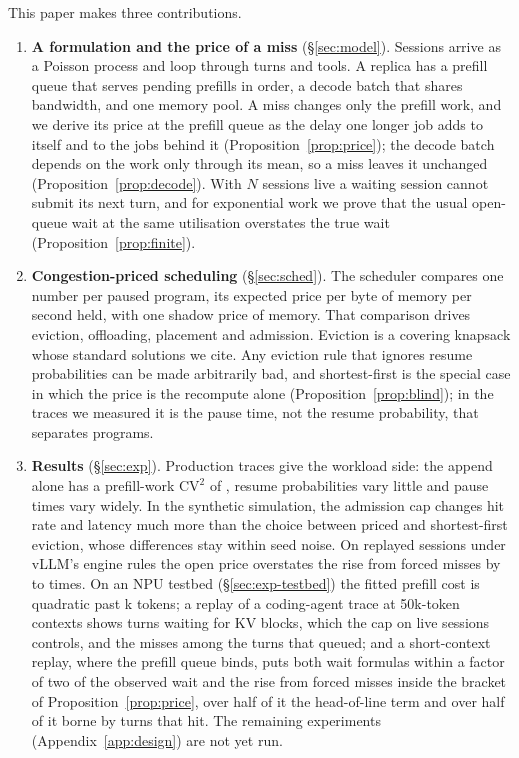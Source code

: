 \documentclass{article}
\theoremstyle{plain}
\theoremstyle{definition}
\theoremstyle{remark}
\begin{document}
This paper makes three contributions.
\begin{enumerate}[leftmargin=*]
\item \textbf{A formulation and the price of a miss} (\S\ref{sec:model}).
Sessions arrive as a Poisson process and loop through turns and tools.
A replica has a prefill queue that serves pending prefills in order, a
decode batch that shares bandwidth, and one memory pool. A miss changes
only the prefill work, and we derive its price at the prefill queue as
the delay one longer job adds to itself and to the jobs behind it
(Proposition~\ref{prop:price}); the decode batch depends on the work
only through its mean, so a miss leaves it unchanged
(Proposition~\ref{prop:decode}). With $N$ sessions live a waiting
session cannot submit its next turn, and for exponential work we prove
that the usual open-queue wait at the same utilisation overstates the
true wait
(Proposition~\ref{prop:finite}).
\item \textbf{Congestion-priced scheduling} (\S\ref{sec:sched}). The
scheduler compares one number per paused program, its expected price
per byte of memory per second held, with one shadow price of memory.
That comparison drives eviction, offloading, placement and admission.
Eviction is a covering knapsack whose standard solutions we cite. Any
eviction rule that ignores resume probabilities can be made arbitrarily
bad, and shortest-first is the special case in which the price is the
recompute alone (Proposition~\ref{prop:blind}); in the traces we
measured it is the pause time, not the resume probability, that
separates programs.
\item \textbf{Results} (\S\ref{sec:exp}). Production traces give the
workload side: the append alone has a prefill-work $\mathrm{CV}^2$ of
\wkCvN, resume probabilities vary little and pause times vary
widely. In the synthetic simulation, the admission cap changes hit rate
and latency much more than the choice between priced and shortest-first
eviction, whose differences stay within seed noise. On replayed sessions under
vLLM's engine rules the open price overstates the rise from forced
misses by \simPriceOverMin{}
to \simPriceOverMax{} times. On an NPU testbed
(\S\ref{sec:exp-testbed}) the fitted prefill cost is quadratic past
\eOneKc k tokens; a replay of a coding-agent trace at 50k-token
contexts shows turns waiting for KV blocks, which the cap on live
sessions controls, and the misses among the turns that queued; and a
short-context replay, where the prefill queue binds, puts both wait
formulas within a factor of two of the observed wait and the rise from
forced misses inside the bracket of Proposition~\ref{prop:price}, over
half of it the head-of-line term and over half of it borne by turns
that hit. The remaining experiments (Appendix~\ref{app:design}) are
not yet run.
\end{enumerate}
\end{document}
